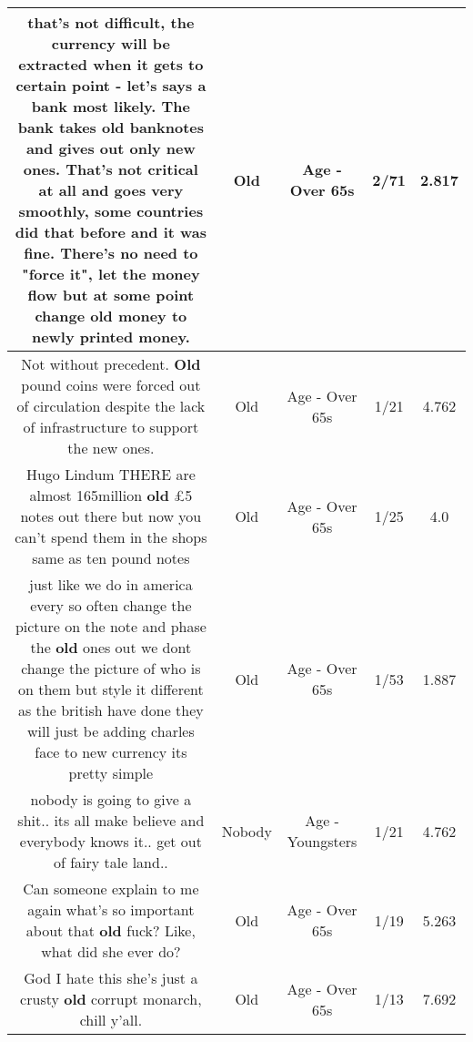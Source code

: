 \documentclass[11pt]{article}
\newlength\mylength
\begin{document}
\begin{center}
\begin{longtable}{|C{.65\mylength}|C{.30\mylength}|C{.12\mylength}|C{.12\mylength}|C{.12\mylength}|}
  \small that's not difficult, the currency will be extracted when it gets to certain point - let's says a bank most likely. The bank takes \textbf{old} banknotes and gives out only new ones. That's not critical at all and goes very smoothly, some countries did that before and it was fine. There's no need to "force it", let the money flow but at some point change \textbf{old} money to newly printed money.\normalsize   & Old & Age - Over 65s & 2/71 & 2.817 \\  \hline
  \small Not without precedent. \textbf{Old} pound coins were forced out of circulation despite the lack of infrastructure to support the new ones.\normalsize   & Old & Age - Over 65s & 1/21 & 4.762 \\  \hline
  \small Hugo Lindum THERE are almost 165million \textbf{old} £5 notes out there but now you can't spend them in the shops same as ten pound notes\normalsize   & Old & Age - Over 65s & 1/25 & 4.0 \\  \hline
  \small just like we do in america  every so often change the picture on the note and phase the \textbf{old} ones out we dont change the picture of who is on them but style it different as the british have done they will just be adding charles face to new currency its pretty simple\normalsize   & Old & Age - Over 65s & 1/53 & 1.887 \\  \hline
  \small nobody is  going to give a shit.. its all make believe and everybody knows it.. get out of fairy tale land..\normalsize   & Nobody & Age - Youngsters & 1/21 & 4.762 \\  \hline
  \small Can someone explain to me again what's so important about that \textbf{old} fuck? Like, what did she ever do?\normalsize   & Old & Age - Over 65s & 1/19 & 5.263 \\  \hline
  \small God I hate this she's just a crusty \textbf{old} corrupt monarch, chill y'all.\normalsize   & Old & Age - Over 65s & 1/13 & 7.692 \\  \hline

\end{longtable}
\end{center}
\end{document}
